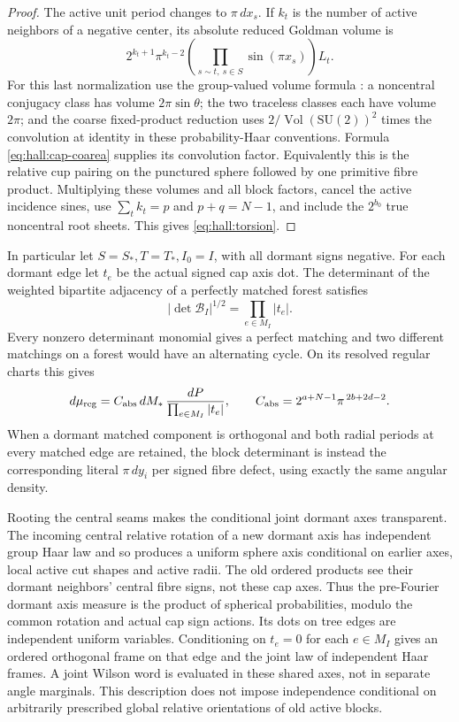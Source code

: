\begin{proof}
The active unit period changes to \(\pi\,dx_s\). If \(k_t\) is the
number of active neighbors of a negative center, its absolute reduced
Goldman volume is
\[
   2^{k_t+1}\pi^{k_t-2}
        \left(\prod_{s\sim t,\ s\in S}\sin(\pi x_s)\right)L_t .
\]
For this last normalization use the group-valued volume formula
\cite{AMW}: a noncentral conjugacy class has volume
\(2\pi\sin\theta\); the two traceless classes each have volume \(2\pi\);
and the coarse fixed-product reduction uses
\(2/\operatorname{Vol}(\mathrm{SU}(2))^2\) times the convolution at
identity in these probability-Haar conventions. Formula
\eqref{eq:hall:cap-coarea} supplies its convolution factor.
Equivalently this is the relative cup pairing on the punctured
sphere followed by one primitive fibre product. Multiplying these
volumes and all block factors, cancel the active incidence sines,
use \(\sum_t k_t=p\) and \(p+q=N-1\), and include the \(2^{b_0}\)
true noncentral root sheets. This gives \eqref{eq:hall:torsion}.
\end{proof}

In particular let \(S=S_*,T=T_*,I_0=I\), with all dormant signs
negative. For each dormant edge let \(t_e\) be the actual signed cap
axis dot. The determinant of the weighted bipartite adjacency of a
perfectly matched forest satisfies
\[
          |\det\mathcal B_I|^{1/2}=\prod_{e\in M_I}|t_e| .
\]
Every nonzero determinant monomial gives a perfect matching and two
different matchings on a forest would have an alternating cycle.
On its resolved regular charts this gives
\begin{equation}
 d\mu_{\rm reg}
      =C_{\rm abs}\,dM_*\,\frac{dP}{\prod_{e\in M_I}|t_e|},
 \qquad C_{\rm abs}=2^{a+N-1}\pi^{\,2b+2d-2}.
 \label{eq:hall:resolved-density}
\end{equation}
When a dormant matched component is orthogonal and both radial
periods at every matched edge are retained, the block determinant is
instead the corresponding literal \(\pi\,dy_i\) per signed fibre
defect, using exactly the same angular density.

Rooting the central seams makes the conditional joint dormant axes
transparent. The incoming central relative rotation of a new dormant
axis has independent group Haar law and so produces a uniform sphere
axis conditional on earlier axes, local active cut shapes and active
radii. The old ordered products see their dormant neighbors' central
fibre signs, not these cap axes. Thus the pre-Fourier dormant axis
measure is the product of spherical probabilities, modulo the common
rotation and actual cap sign actions. Its dots on tree edges are
independent uniform variables. Conditioning on \(t_e=0\) for each
\(e\in M_I\) gives an ordered orthogonal frame on that edge and the
joint law of independent Haar frames. A joint Wilson word is evaluated
in these shared axes, not in separate angle marginals. This description
does not impose independence conditional on arbitrarily prescribed
global relative orientations of old active blocks.

